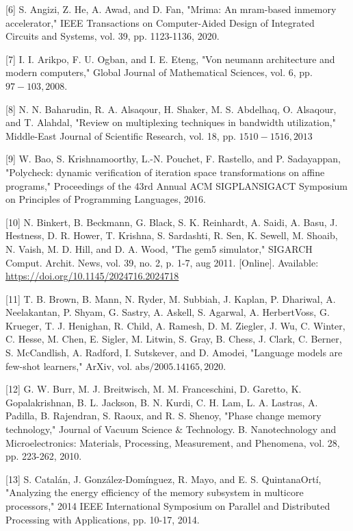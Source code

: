 \documentclass[10pt]{article}
\begin{document}
[6] S. Angizi, Z. He, A. Awad, and D. Fan, "Mrima: An mram-based inmemory accelerator," IEEE Transactions on Computer-Aided Design of Integrated Circuits and Systems, vol. 39, pp. 1123-1136, 2020.

[7] I. I. Arikpo, F. U. Ogban, and I. E. Eteng, "Von neumann architecture and modern computers," Global Journal of Mathematical Sciences, vol. 6, pp. $97-103,2008$.

[8] N. N. Baharudin, R. A. Alsaqour, H. Shaker, M. S. Abdelhaq, O. Alsaqour, and T. Alahdal, "Review on multiplexing techniques in bandwidth utilization," Middle-East Journal of Scientific Research, vol. 18, pp. $1510-1516,2013$

[9] W. Bao, S. Krishnamoorthy, L.-N. Pouchet, F. Rastello, and P. Sadayappan, "Polycheck: dynamic verification of iteration space transformations on affine programs," Proceedings of the 43rd Annual ACM SIGPLANSIGACT Symposium on Principles of Programming Languages, 2016.

[10] N. Binkert, B. Beckmann, G. Black, S. K. Reinhardt, A. Saidi, A. Basu, J. Hestness, D. R. Hower, T. Krishna, S. Sardashti, R. Sen, K. Sewell, M. Shoaib, N. Vaish, M. D. Hill, and D. A. Wood, "The gem5 simulator," SIGARCH Comput. Archit. News, vol. 39, no. 2, p. 1-7, aug 2011. [Online]. Available: \href{https://doi.org/10.1145/2024716.2024718}{https://doi.org/10.1145/2024716.2024718}

[11] T. B. Brown, B. Mann, N. Ryder, M. Subbiah, J. Kaplan, P. Dhariwal, A. Neelakantan, P. Shyam, G. Sastry, A. Askell, S. Agarwal, A. HerbertVoss, G. Krueger, T. J. Henighan, R. Child, A. Ramesh, D. M. Ziegler, J. Wu, C. Winter, C. Hesse, M. Chen, E. Sigler, M. Litwin, S. Gray, B. Chess, J. Clark, C. Berner, S. McCandlish, A. Radford, I. Sutskever, and D. Amodei, "Language models are few-shot learners," ArXiv, vol. $\mathrm{abs} / 2005.14165,2020$.

[12] G. W. Burr, M. J. Breitwisch, M. M. Franceschini, D. Garetto, K. Gopalakrishnan, B. L. Jackson, B. N. Kurdi, C. H. Lam, L. A. Lastras, A. Padilla, B. Rajendran, S. Raoux, and R. S. Shenoy, "Phase change memory technology," Journal of Vacuum Science \& Technology. B. Nanotechnology and Microelectronics: Materials, Processing, Measurement, and Phenomena, vol. 28, pp. 223-262, 2010.

[13] S. Catalán, J. González-Domínguez, R. Mayo, and E. S. QuintanaOrtí, "Analyzing the energy efficiency of the memory subsystem in multicore processors," 2014 IEEE International Symposium on Parallel and Distributed Processing with Applications, pp. 10-17, 2014.
\end{document}
